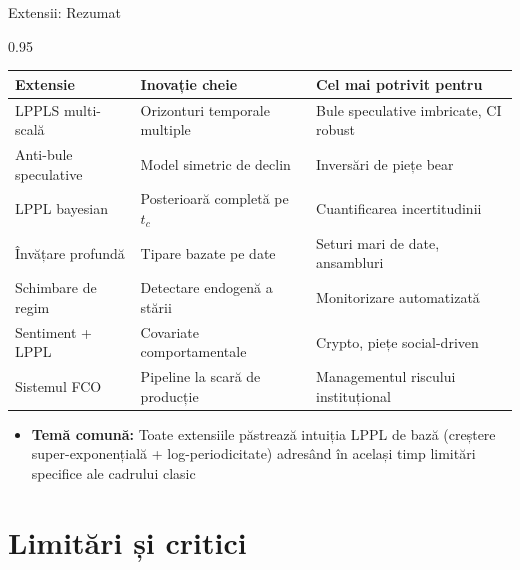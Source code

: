 \documentclass[9pt, aspectratio=169, t]{beamer}
\begin{document}
\begin{frame}{Extensii: Rezumat}
    \begin{cminipage}{0.95\textwidth}
    {\footnotesize
    \begin{center}
        \begin{tabular}{p{3.5cm}p{4cm}p{4.5cm}}
            \toprule
            \textbf{Extensie} & \textbf{Inovație cheie} & \textbf{Cel mai potrivit pentru} \\
            \midrule
            LPPLS multi-scală & Orizonturi temporale multiple & Bule speculative imbricate, CI robust \\
            \addlinespace
            Anti-bule speculative & Model simetric de declin & Inversări de piețe bear \\
            \addlinespace
            LPPL bayesian & Posterioară completă pe $t_c$ & Cuantificarea incertitudinii \\
            \addlinespace
            Învățare profundă & Tipare bazate pe date & Seturi mari de date, ansambluri \\
            \addlinespace
            Schimbare de regim & Detectare endogenă a stării & Monitorizare automatizată \\
            \addlinespace
            Sentiment + LPPL & Covariate comportamentale & Crypto, piețe social-driven \\
            \addlinespace
            Sistemul FCO & Pipeline la scară de producție & Managementul riscului instituțional \\
            \bottomrule
        \end{tabular}
    \end{center}

    \vspace{1mm}
    \begin{itemize}\setlength{\itemsep}{0pt}
        \item \textbf{Temă comună:} Toate extensiile păstrează intuiția LPPL de bază (creștere super-exponențială + log-periodicitate) adresând în același timp limitări specifice ale cadrului clasic
    \end{itemize}
    }
    \end{cminipage}
\end{frame}

\section{Limitări și critici}
\end{document}
